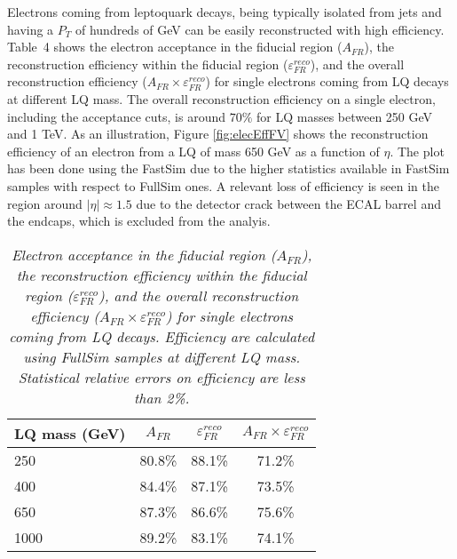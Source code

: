\documentclass[colclass=cmspaper]{combine}
\begin{document}
\begin{linenumbers}
Electrons coming from leptoquark decays, 
being typically isolated from jets and having a $P_{T}$ of hundreds of GeV can be easily reconstructed with high efficiency. 
Table~4
shows the electron acceptance in the fiducial region ($A_{FR}$), the 
reconstruction efficiency within the fiducial region ($\varepsilon_{FR}^{reco}$), and the overall reconstruction efficiency 
($A_{FR} \times \varepsilon_{FR}^{reco}$) for single electrons coming from LQ decays at different LQ mass.
The overall reconstruction efficiency on a single electron, including the acceptance cuts, is around $70\%$ for LQ masses between 250 GeV and 1 TeV.
As an illustration, Figure \ref{fig:elecEffFV} shows the reconstruction efficiency of an electron
from a LQ of mass 650 GeV as a function of $\eta$. The plot has been done using the FastSim 
due to the higher statistics available in FastSim samples with respect to FullSim ones. 
A relevant loss of efficiency is seen in the region around $|\eta| \approx 1.5$ due to the detector crack between the ECAL barrel and the endcaps, 
which is excluded from the analyis. %

\begin{table}[htb]
  \label{tab:ElecEffAcc}
  \begin{center}
    \begin{tabular}{|l|c|c|c|} \hline
      LQ mass (GeV) & $A_{FR}$ & $\varepsilon_{FR}^{reco}$ & $A_{FR} \times \varepsilon_{FR}^{reco}$\\ \hline
      250 & 80.8\% & 88.1\% & 71.2\% \\ \hline
      400 & 84.4\% & 87.1\% & 73.5\% \\ \hline
      650 & 87.3\% & 86.6\% & 75.6\% \\ \hline
      1000 & 89.2\% & 83.1\% & 74.1\% \\ \hline
    \end{tabular}
    \caption{\small \sl Electron acceptance in the fiducial region ($A_{FR}$), the 
      reconstruction efficiency within the fiducial region ($\varepsilon_{FR}^{reco}$), and the overall reconstruction efficiency 
      ($A_{FR} \times \varepsilon_{FR}^{reco}$) for single electrons coming from LQ decays. Efficiency are 
      calculated using FullSim samples at different LQ mass. Statistical relative errors on efficiency are less than 2\%.}
  \end{center}
\end{table}


\end{linenumbers}
\end{document}

